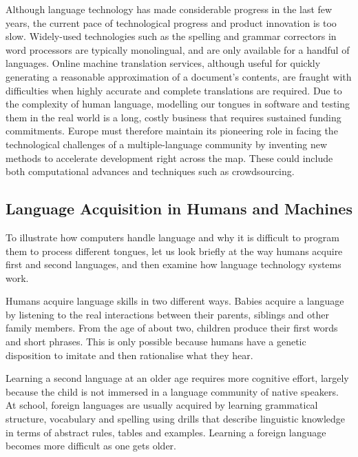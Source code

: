 \documentclass[]{../../metanetpaper}
\begin{document}
\begin{multicols}{2}
Although language technology has made considerable progress in the last few years, the current pace of technological progress and product innovation is too slow. Widely-used technologies such as the spelling and grammar correctors in word processors are typically monolingual, and are only available for a handful of languages. Online machine translation services, although useful for quickly generating a reasonable approximation of a document’s contents, are fraught with difficulties when highly accurate and complete translations are required. Due to the complexity of human language, modelling our tongues in software and testing them in the real world is a long, costly business that requires sustained funding commitments. Europe must therefore maintain its pioneering role in facing the technological challenges of a multiple-language community by inventing new methods to accelerate development right across the map. These could include both computational advances and techniques such as crowdsourcing.


\subsection{Language Acquisition in Humans and Machines}

To illustrate how computers handle language and why it is difficult to program them to process different tongues, let us look briefly at the way humans acquire first and second languages, and then examine how language technology systems work.

Humans acquire language skills in two different ways. Babies acquire a language by listening to the real interactions between their parents, siblings and other family members. From the age of about two, children produce their first words and short phrases. This is only possible because humans have a genetic disposition to imitate and then rationalise what they hear. 

Learning a second language at an older age requires more cognitive effort, largely because the child is not immersed in a language community of native speakers. At school, foreign languages are usually acquired by learning grammatical structure, vocabulary and spelling using drills that describe linguistic knowledge in terms of abstract rules, tables and examples. Learning a foreign language becomes more difficult as one gets older.



\end{multicols}
\end{document}
